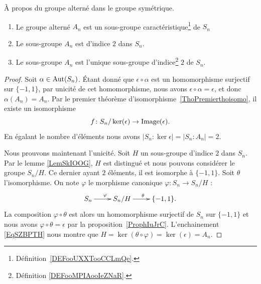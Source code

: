 \begin{proposition} \label{PROPooCPXOooVxPAij}
    À propos du groupe alterné dans le groupe symétrique.
    \begin{enumerate}
        \item
            Le groupe alterné \( A_n\) est un sous-groupe caractéristique\footnote{Définition~\ref{DEFooUXXTooCCLmQe}.} de \( S_n\)
        \item   \label{ITEMooWXXUooOWvFgE}
            Le sous-groupe \( A_n\) est d'indice \( 2\) dans \( S_n\).
        \item       \label{ITEMooGGAHooRYgNqq}
            Le sous-groupe \( A_n\) est l'unique sous-groupe d'indice\footnote{Définition \ref{DEFooMPIAooIeZNaR}.} \( 2\) de \( S_n\).
    \end{enumerate}
\end{proposition}

\begin{proof}
    Soit \( \alpha\in \operatorname{Aut}(S_n)\). Étant donné que \( \epsilon\circ\alpha\) est un homomorphisme surjectif sur \( \{ -1,1 \}\), par unicité de cet homomorphisme, nous avons \( \epsilon\circ\alpha=\epsilon\), et donc \( \alpha(A_n)=A_n\). Par le premier théorème d'isomorphisme~\ref{ThoPremierthoisomo}, il existe un isomorphisme
    \begin{equation}
        f\colon S_n/\ker(\epsilon)\to \operatorname{Image}(\epsilon).
    \end{equation}
    En égalant le nombre d'éléments nous avons \( | S_n:\ker\epsilon |=| S_n:A_n |=2\).

    Nous prouvons maintenant l'unicité. Soit \( H\) un sous-groupe d'indice \( 2\) dans \( S_n\). Par le lemme \ref{LemSkIOOG}, \( H\) est distingué et nous pouvons considérer le groupe \( S_n/H\). Ce dernier ayant \( 2\) éléments, il est isomorphe à \( \{ -1,1 \}\). Soit \( \theta\) l'isomorphisme. On note \( \varphi\) le morphisme canonique \( \varphi\colon S_n\to S_n/H\) :
    \begin{equation}    \label{EqSZBPTH}
        \xymatrix{%
        S_n \ar[r]^{\varphi}        &   S_n/H\ar[r]^{\theta}&\{ -1,1 \}.
           }
    \end{equation}
    La composition \( \varphi\circ \theta\) est alors un homomorphisme surjectif de \( S_n\) sur \( \{ -1,1 \}\) et nous avons \( \varphi\circ\theta=\epsilon\) par la proposition~\ref{ProphIuJrC}. L'enchainement \eqref{EqSZBPTH} nous montre que \( H=\ker(\theta\circ\varphi)=\ker(\epsilon)=A_n\).
\end{proof}

